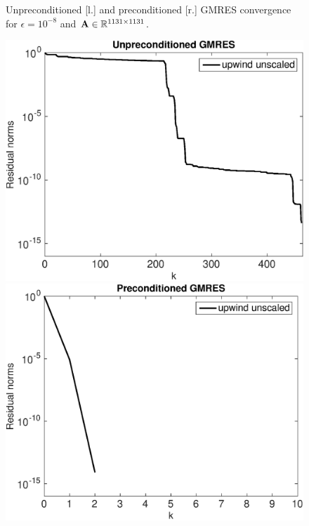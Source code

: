 \begin{figure}[tbhp]
\begin{minipage}[t]{0.5\linewidth}
\vspace*{-1em}
\end{minipage}
\vspace*{-1em}
\caption{Unpreconditioned [l.] and preconditioned [r.] GMRES convergence for $\epsilon=10^{-8}$ and $\mathbf{A} \in \mathbb{R}^{1131\times1131}$.}\label{fig:2D:prec1}
\end{figure}
%
\begin{figure}[tbhp]
\hspace*{-0.5em}
\begin{minipage}[t]{0.5\linewidth}
\includegraphics[width=0.95\linewidth]{figures/gmres_upwind2D_eps_1e-06_N_30_M_40}
\vspace*{-1em}
\end{minipage}
%
\begin{minipage}[t]{0.5\linewidth}
\includegraphics[width=0.95\linewidth]{figures/gmres_precond_upwind2D_eps_1e-06_N_30_M_40}

\end{minipage}
\end{figure}
